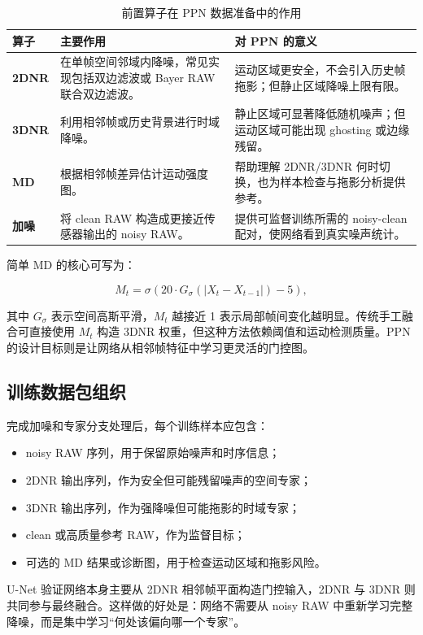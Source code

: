 \documentclass[UTF8,zihao=-4]{ctexart}
\begin{document}
\begin{table}[htbp]
\centering
\caption{前置算子在 PPN 数据准备中的作用}
\begin{tabularx}{\textwidth}{>{\bfseries}p{2.3cm} X X}
\toprule
算子 & 主要作用 & 对 PPN 的意义 \\
\midrule
2DNR & 在单帧空间邻域内降噪，常见实现包括双边滤波或 Bayer RAW 联合双边滤波。 & 运动区域更安全，不会引入历史帧拖影；但静止区域降噪上限有限。 \\
3DNR & 利用相邻帧或历史背景进行时域降噪。 & 静止区域可显著降低随机噪声；但运动区域可能出现 ghosting 或边缘残留。 \\
MD & 根据相邻帧差异估计运动强度图。 & 帮助理解 2DNR/3DNR 何时切换，也为样本检查与拖影分析提供参考。 \\
加噪 & 将 clean RAW 构造成更接近传感器输出的 noisy RAW。 & 提供可监督训练所需的 noisy-clean 配对，使网络看到真实噪声统计。 \\
\bottomrule
\end{tabularx}
\end{table}

简单 MD 的核心可写为：

\[
M_t=\sigma\left(20\cdot G_\sigma(|X_t-X_{t-1}|)-5\right),
\]

其中 $G_\sigma$ 表示空间高斯平滑，$M_t$ 越接近 1 表示局部帧间变化越明显。传统手工融合可直接使用 $M_t$ 构造 3DNR 权重，但这种方法依赖阈值和运动检测质量。PPN 的设计目标则是让网络从相邻帧特征中学习更灵活的门控图。

\subsection{训练数据包组织}

完成加噪和专家分支处理后，每个训练样本应包含：

\begin{itemize}
  \item noisy RAW 序列，用于保留原始噪声和时序信息；
  \item 2DNR 输出序列，作为安全但可能残留噪声的空间专家；
  \item 3DNR 输出序列，作为强降噪但可能拖影的时域专家；
  \item clean 或高质量参考 RAW，作为监督目标；
  \item 可选的 MD 结果或诊断图，用于检查运动区域和拖影风险。
\end{itemize}

U-Net 验证网络本身主要从 2DNR 相邻帧平面构造门控输入，2DNR 与 3DNR 则共同参与最终融合。这样做的好处是：网络不需要从 noisy RAW 中重新学习完整降噪，而是集中学习“何处该偏向哪一个专家”。
\end{document}
